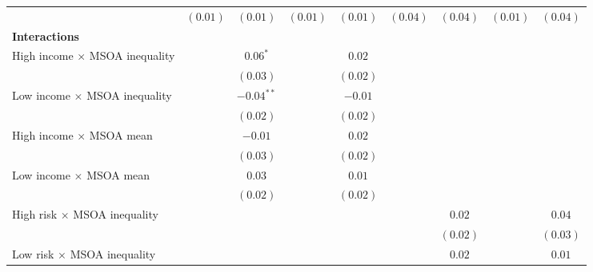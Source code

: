 \documentclass[12pt, letter]{scrartcl}
\begin{document}
\begin{tiny}
\begin{longtable}{lcccccccc}
                                            & $(0.01)$      & $(0.01)$      & $(0.01)$      & $(0.01)$      & $(0.04)$      & $(0.04)$      & $(0.01)$      & $(0.04)$      \\
\multicolumn{5}{l}{\textbf{Interactions}} \\[5pt]
High income $\times$ MSOA inequality        &               & $0.06^{*}$    &               & $0.02$        &               &               &               &               \\
                                            &               & $(0.03)$      &               & $(0.02)$      &               &               &               &               \\
Low income $\times$ MSOA inequality         &               & $-0.04^{**}$  &               & $-0.01$       &               &               &               &               \\
                                            &               & $(0.02)$      &               & $(0.02)$      &               &               &               &               \\
High income $\times$ MSOA mean              &               & $-0.01$       &               & $0.02$        &               &               &               &               \\
                                            &               & $(0.03)$      &               & $(0.02)$      &               &               &               &               \\
Low income $\times$ MSOA mean               &               & $0.03$        &               & $0.01$        &               &               &               &               \\
                                            &               & $(0.02)$      &               & $(0.02)$      &               &               &               &               \\
High risk $\times$ MSOA inequality          &               &               &               &               &               & $0.02$        &               & $0.04$        \\
                                            &               &               &               &               &               & $(0.02)$      &               & $(0.03)$      \\
Low risk $\times$ MSOA inequality           &               &               &               &               &               & $0.02$        &               & $0.01$        \\

\end{longtable}
\end{tiny}
\end{document}
